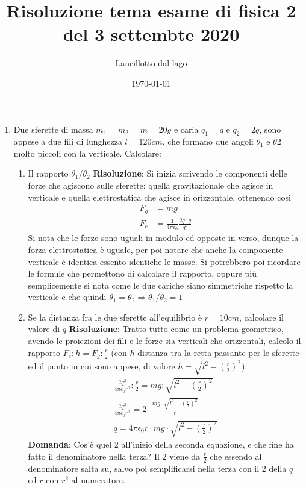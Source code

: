\documentclass{article}
\title{Risoluzione tema esame di fisica 2 del 3 settembte 2020}
\author{Lancillotto dal lago}
\date{\today}
\begin{document}
\maketitle

\begin{enumerate}
    
    \item Due sferette di massa $m_1 = m_2 = m = 20g$ e caria $q_1 = q$ e $q_2 = 2q$, sono appese a
    due fili di lunghezza $l = 120cm$, che formano due angoli $\theta_1$ e $\theta2$ molto piccoli
    con la verticale. Calcolare:
    
    \begin{enumerate}
        \item Il rapporto $\theta_1 / \theta_2$
        \newline 
        \textbf{Risoluzione}: Si inizia scrivendo le componenti delle forze che agiscono sulle sferette: quella gravitazionale che agisce in verticale 
        e quella elettrostatica che agisce in orizzontale, ottenendo così 
        \begin{align*}
            F_g & = mg \\
            F_e & = \frac{1}{4 \pi \epsilon_0} \frac{2q \cdot q}{d^2}
        \end{align*}
        Si nota che le forze sono uguali in modulo ed opposte in verso, dunque la forza elettrostatica è uguale, per poi notare che anche la componente verticale 
        è identica essento identiche le masse. Si potrebbero poi ricordare le formule che permettono di calcolare il rapporto, oppure più semplicemente si nota come le 
        due cariche siano simmetriche rispetto la verticale e che quindi $\theta_1 = \theta_2 \Rightarrow \theta_1 / \theta_2 = 1$ 
        \item Se la distanza fra le due sferette all’equilibrio è $r = 10cm$, calcolare il valore di $q$
        \newline 
        \textbf{Risoluzione}: Tratto tutto come un problema geometrico, avendo le proiezioni dei fili e le forze sia verticali che orizzontali, calcolo il rapporto 
        $F_e : h = F_g : \frac{r}{2}$ (con $h$ distanza tra la retta passante per le sferette ed il punto in cui sono appese, di valore 
        $h = \sqrt{l^2 - \left( \frac{r}{2}\right)^2}$):
        \begin{align*}
            \frac{2q^2}{4 \pi \epsilon_0 r^2} : \frac{r}{2} = mg : \sqrt{l^2 - \left( \frac{r}{2}\right)^2} \\
            \frac{2q^2}{4 \pi \epsilon_0 r^2} = 2 \cdot \frac{mg \cdot \sqrt{l^2 - \left( \frac{r}{2}\right)^2}}{r} \\ 
            q = 4 \pi \epsilon_0 r \cdot mg \cdot \sqrt{l^2 - \left( \frac{r}{2}\right)^2}
        \end{align*}
        \textbf{Domanda}: Cos'è quel $2$ all'inizio della seconda equazione, e che fine ha fatto il denominatore nella terza?
        \newline
        Il $2$ viene da $\frac{r}{2}$ che essendo al denominatore salta su, salvo poi semplificarsi nella terza con il $2$ della $q$ ed $r$ con $r^2$ al numeratore.
 

\end{enumerate}
\end{enumerate}
\end{document}
